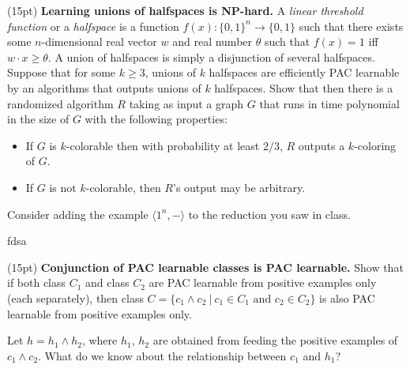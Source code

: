 \documentclass[11pt]{article}
\DeclareMathOperator{\1}{\mathbbm{1}}
\begin{document}
\begin{problem}(15pt) \textbf{Learning unions of halfspaces is NP-hard.} A {\em linear threshold function} or a {\em halfspace} is a function
$f(x): \{0,1\}^n \rightarrow \{0,1\}$ such that there exists some
$n$-dimensional real vector $w$ and real number $\theta$ such that
$f(x) = 1$ iff $w \cdot x \geq \theta.$ 
A union of halfspaces is simply a disjunction of several halfspaces. Suppose that for some $k \ge 3$, unions of $k$ halfspaces are
efficiently PAC learnable by an algorithms that outputs unions of $k$ halfspaces. 
Show that then there is a randomized algorithm $R$ taking as input a graph
$G$ that runs in
time polynomial in the size of $G$ with the
following properties:
\begin{itemize}
\item If $G$ is $k$-colorable then with probability
at least $2/3$, $R$ outputs a $k$-coloring of $G$.
\item If $G$ is not $k$-colorable, then $R$'s output may be arbitrary.
\end{itemize}

\hint Consider adding the example $\langle 1^n, - \rangle$ to the reduction you saw in class.
\end{problem}

fdsa



\begin{problem}(15pt) \textbf{Conjunction of PAC learnable classes is PAC learnable.}  
Show that if both class $C_1$ and class $C_2$ are PAC learnable from
positive examples only (each separately), then class $C=\{c_1\wedge c_2\ |\
c_1\in C_1\mbox{ and } c_2\in C_2\}$ is also PAC learnable from positive
examples only.
\end{problem} 
\begin{hint}
Let $h = h_1 \wedge h_2$, where $h_1$, $h_2$ are obtained from feeding the positive 
examples of $c_1\wedge c_2$. What do we know about the relationship between $c_1$
and $h_1$?
\end{hint}


\end{document}
